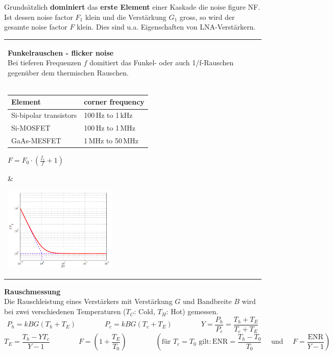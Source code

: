 Grundsätzlich \textbf{dominiert} das \textbf{erste Element} einer Kaskade die noise figure NF. Ist dessen noise factor
$F_1$ klein und die Verstärkung $G_1$ gross, so wird der gesamte noise factor $F$ klein. Dies sind
u.a. Eigenschaften von LNA-Verstärkern.\\

\begin{tabular}{ll}
\parbox{12cm}{
    \textbf{Funkelrauschen - flicker noise } \\
    Bei tieferen Frequenzen $f$ domitiert das Funkel- oder auch 1/f-Rauschen gegenüber dem
    thermischen Rauschen. \\ \\
    \parbox{8cm}{
    \begin{tabular}{|l|l|}\hline
    Element & corner frequency $f_c$ \\ \hline \hline
    Si-bipolar transistors & 100\,Hz to 1\,kHz \\ \hline
    Si-MOSFET              & 100\,Hz to 1\,MHz \\ \hline
    GaAs-MESFET            & 1\,MHz to 50\,MHz \\ \hline
    \end{tabular}
}
    \parbox{3cm}{
    $F=F_0 \cdot \left(\frac{f_c}{f}+ 1\right)$
    }
     }
& \parbox{6cm}{        
        \includegraphics[height=4cm]{./bilder/components_amplifier_noise_flicker.png}
        }\\
\end{tabular}

    \textbf{Rauschmessung }\\
    Die Rauschleistung eines Verstärkers mit Verstärkung $G$ und Bandbreite $B$
    wird bei zwei verschiedenen Temperaturen ($T_C$: Cold, $T_H$: Hot) gemessen.    
    $$ P_h = k B G(T_h+ T_E) \qquad \qquad  P_c = k B G(T_c+ T_E) \qquad \qquad 
    Y=\frac{P_h}{P_c} = \frac{T_h+ T_E}{T_c+ T_E} $$
    $$  T_E=\frac{T_h-YT_c}{Y-1} \qquad \qquad   
     F = \left(1+ \frac{T_E}{T_0}\right)
    \qquad \qquad 
    \left( \text{für } T_c = T_0 \text{ gilt}: \text{ENR} = \frac{T_h-T_0}{T_0}
     \quad \text{ und } \quad  F= \frac{\text{ENR}}{Y-1}  \right)$$
    

